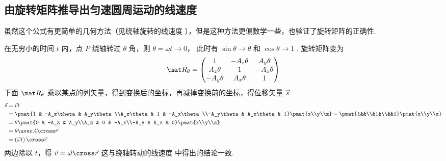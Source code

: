 \subsection{由旋转矩阵推导出匀速圆周运动的线速度} 

虽然这个公式有更简单的几何方法（见绕轴旋转的线速度%
），但是这种方法更偏数学一些，也验证了旋转矩阵的正确性.

在无穷小的时间 $t$ 内，点 $P$ 绕轴转过 $\theta $ 角，则 $\theta  = \omega t \to 0$， 此时有 $\sin\theta  \to \theta $ 和 $\cos \theta  \to 1$ . 旋转矩阵变为
\begin{equation}
\mat R_\theta =
\begin{pmatrix}
{1}&{ - {A_z}\theta }&{{A_y}\theta }\\
{{A_z}\theta }&1&{ - {A_x}\theta }\\
{ - {A_y}\theta }&{{A_x}\theta }&1
\end{pmatrix}
\end{equation}
下面 $\mat R_\theta$ 乘以某点的列矢量，得到变换后的坐标，再减掉变换前的坐标，得位移矢量 $\vec s$
\begin{equation}\begin{split}
\vec s &= \vec v t\\
&= \pmat{1 & -A_z\theta & A_y\theta\\A_z\theta & 1 & -A_x\theta\\-A_y\theta & A_x\theta & 1} \pmat{x\\y\\z}
-\pmat{1&&\\&1&\\&&1} \pmat{x\\y\\z}\\
&= \theta \pmat{0 & -A_z & A_y\\A_z & 0 & -A_x\\-A_y & A_x & 0}\pmat{x\\y\\z}\\
&= \theta\uvec A\cross\vec r\\
&= \left(\vec \omega t\right) \cross \vec r
\end{split}\end{equation} 
两边除以 $t$，得 $\vec v = \vec \omega  \cross \vec r$ 这与绕轴转动的线速度%
中得出的结论一致.